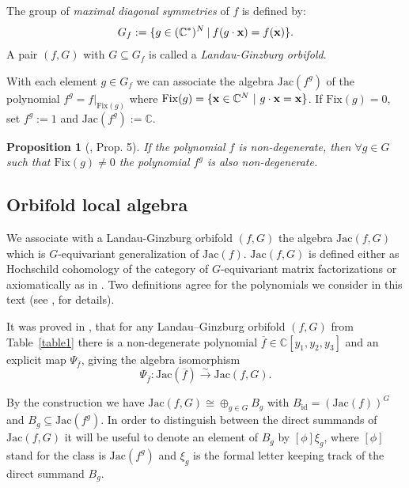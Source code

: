 \documentclass[reqno,12pt]{amsart}
\numberwithin{equation}{section}
\theoremstyle{plain}
\newtheorem{proposition}[theorem]{Proposition}
\theoremstyle{definition}
\newtheorem{definition}[theorem]{Definition}
\newcommand{\CC}{{\mathbb{C}}}
\newcommand{\Jac}{\mathrm{Jac}}
\newcommand{\Fix}{\mathrm{Fix}}
\newcommand{\id}{\mathrm{id}}
\newcommand{\bx}{{\bf x}}
\newcommand{\hess}{\mathrm{hess}}
\numberwithin{equation}{section}
\begin{document}

The group of \emph{maximal diagonal symmetries} of $f$ is defined by:
\begin{align*}
    G_f := \{ g \in (\mathbb{C}^*)^N \:|\: f(g \cdot \bx ) = f(\bx) \}.
\end{align*}
A pair $(f,G)$ with $G\subseteq G_f$ is called a \emph{Landau-Ginzburg orbifold}. 

With each element $g\in G_f$ we can associate the algebra $\mathrm{Jac}(f^g)$ of the polynomial $f^g = f|_{\Fix(g)}$ where $\Fix(g) = \{\bx \in \CC^N \ | \ g\cdot \bx= \bx \}$. If $\Fix(g) = 0$, set $f^g := 1$ and $\mathrm{Jac}(f^g) := \CC$. 

\begin{proposition}[\cite{ET1}, Prop. 5]
 If the polynomial $f$ is non-degenerate, then $\forall g\in G$ such that $\Fix(g) \neq 0$ the polynomial $f^g$ is also non-degenerate.
\end{proposition}

\subsection{Orbifold local algebra}
We associate with a Landau-Ginzburg orbifold $(f,G)$ the algebra $\Jac(f,G)$ which is $G$-equivariant generalization of $\Jac(f)$. 
$\Jac(f,G)$ is defined either as Hochschild cohomology of the category of $G$-equivariant matrix factorizations or axiomatically as in \cite{BTW1,BTW2}. Two definitions agree for the polynomials we consider in this text (see \cite{Sh}, \cite{BT1} for details). 

It was proved in \cite{BTW1}, that for any Landau--Ginzburg orbifold $(f,G)$ from Table~\ref{table1} there is a non-degenerate polynomial $\overline f \in \CC[y_1,y_2,y_3]$ and an explicit map $\Psi_{\overline f}$, giving the algebra isomorphism
\begin{equation}\label{eq: orb iso}
 \Psi_{\overline f}: \Jac(\overline f) \xrightarrow{\sim} \Jac(f,G).
\end{equation}

By the construction we have $\Jac(f,G) \cong \oplus_{g \in G} B_g$ with $B_\id = (\Jac(f))^G$ and $B_g \subseteq \Jac(f^g)$. 
In order to distinguish between the direct summands of $\Jac(f,G)$ it will be useful to denote an element of $B_g$ by $[\phi]\xi_g$, where $[\phi]$ stand for the class is $\Jac(f^g)$ and $\xi_g$ is the formal letter keeping track of the direct summand $B_g$. 
\end{document}
